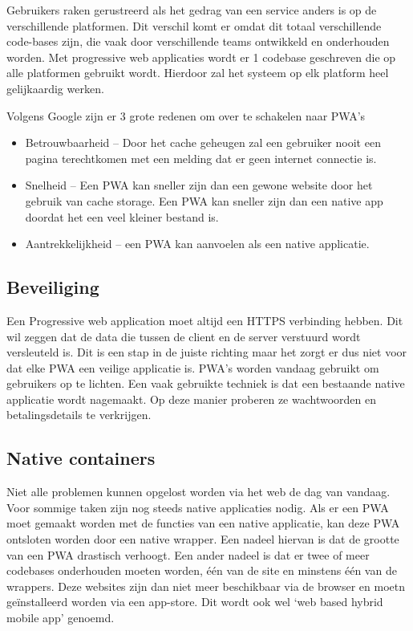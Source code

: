 Gebruikers raken gerustreerd als het gedrag van een service anders is op de verschillende platformen. Dit verschil komt er omdat dit totaal verschillende code-bases zijn, die vaak door verschillende teams ontwikkeld en onderhouden worden. Met progressive web applicaties wordt er 1 codebase geschreven die op alle platformen gebruikt wordt. Hierdoor zal het systeem op elk platform heel gelijkaardig werken.
\autocite{Google2019}

Volgens Google zijn er 3 grote redenen om over te schakelen naar PWA’s

\begin{itemize}
    \item Betrouwbaarheid – Door het cache geheugen zal een gebruiker nooit een pagina terechtkomen met een melding dat er geen internet connectie is.
    \item Snelheid – Een PWA kan sneller zijn dan een gewone website door het gebruik van cache storage. Een PWA kan sneller zijn dan een native app doordat het een veel kleiner bestand is.
    \item Aantrekkelijkheid – een PWA kan aanvoelen als een native applicatie.
\end{itemize}
\autocite{GooglePwa2019}

\subsection{Beveiliging}
Een Progressive web application moet altijd een HTTPS verbinding hebben. Dit wil zeggen dat de data die tussen de client en de server verstuurd wordt versleuteld is.
\autocite{Durumeric2013}
Dit is een stap in de juiste richting maar het zorgt er dus niet voor dat elke PWA een veilige applicatie is. PWA’s worden vandaag gebruikt om gebruikers op te lichten. Een vaak gebruikte techniek is dat een bestaande native applicatie wordt nagemaakt. Op deze manier proberen ze wachtwoorden en betalingsdetails te verkrijgen.
\autocite{Lee2018}

\subsection{Native containers}
Niet alle problemen kunnen opgelost worden via het web de dag van vandaag. Voor sommige taken zijn nog steeds native applicaties nodig. Als er een PWA moet gemaakt worden met de functies van een native applicatie, kan deze PWA ontsloten worden door een native wrapper.
Een nadeel hiervan is dat de grootte van een PWA drastisch verhoogt.
Een ander nadeel is dat er twee of meer codebases onderhouden moeten worden, één van de site en minstens één van de wrappers.
Deze websites zijn dan niet meer beschikbaar via de browser en moetn geïnstalleerd worden via een app-store.
Dit wordt ook wel ‘web based hybrid mobile app’ genoemd.
\autocite{Richard2019} \autocite{Malavolta2016}

